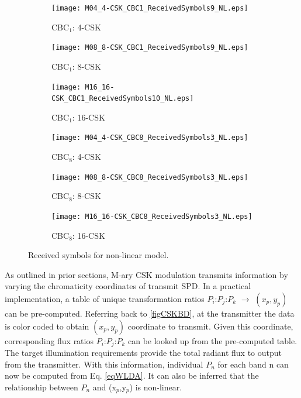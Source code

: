 \documentclass[10pt,letterpaper]{article}
\begin{document}
\begin{figure}[b]
	\centering
		\begin{subfigure}{0.32\textwidth}
		\centering
			\texttt{[image: M04\_4-CSK\_CBC1\_ReceivedSymbols9\_NL.eps]}
			\caption{CBC$_{1}$: 4-CSK}
			\label{fig4RcvSym_NL}
		\end{subfigure}
		\begin{subfigure}{0.32\textwidth}
		\centering
			\texttt{[image: M08\_8-CSK\_CBC1\_ReceivedSymbols9\_NL.eps]}
			\caption{CBC$_{1}$: 8-CSK}
			\label{fig8RcvSym_NL}
		\end{subfigure}
		\begin{subfigure}{0.32\textwidth}
		\centering
			\texttt{[image: M16\_16-CSK\_CBC1\_ReceivedSymbols10\_NL.eps]}
			\caption{CBC$_{1}$: 16-CSK}
			\label{fig16RcvSym_NL}
		\end{subfigure}
		\begin{subfigure}{0.32\textwidth}
		\centering
			\texttt{[image: M04\_4-CSK\_CBC8\_ReceivedSymbols3\_NL.eps]}
			\caption{CBC$_{8}$: 4-CSK}
			\label{fig4RcvSym_NL8}
		\end{subfigure}
		\begin{subfigure}{0.32\textwidth}
		\centering
			\texttt{[image: M08\_8-CSK\_CBC8\_ReceivedSymbols3\_NL.eps]}
			\caption{CBC$_{8}$: 8-CSK}
			\label{fig8RcvSym_NL8}
		\end{subfigure}
		\begin{subfigure}{0.32\textwidth}
		\centering
			\texttt{[image: M16\_16-CSK\_CBC8\_ReceivedSymbols3\_NL.eps]}
			\caption{CBC$_{8}$: 16-CSK}
			\label{fig16RcvSym_NL8}
		\end{subfigure}
	\caption{Received symbols for non-linear model.}
	\label{figRcvSym_NL}
\end{figure}

As outlined in prior sections, M-ary CSK modulation transmits information by varying the chromaticity coordinates of transmit SPD. In a practical implementation, a table of unique transformation ratios $P_{i}$:$P_{j}$:$P_{k}$ $\rightarrow$ $(x_{p},y_{p})$ can be pre-computed. Referring back to \figurename\ref{figCSKBD}, at the transmitter the data is color coded to obtain $(x_{p},y_{p})$ coordinate to transmit. Given this coordinate, corresponding flux ratios $P_{i}$:$P_{j}$:$P_{k}$ can be looked up from the pre-computed table. The target illumination requirements provide the total radiant flux to output from the transmitter. With this information, individual $P_{n}$ for each band n can now be computed from Eq. \eqref{eqWLDA}. It can also be inferred that the relationship between $P_{n}$ and (x$_{p}$,y$_{p}$) is non-linear.
\end{document}
